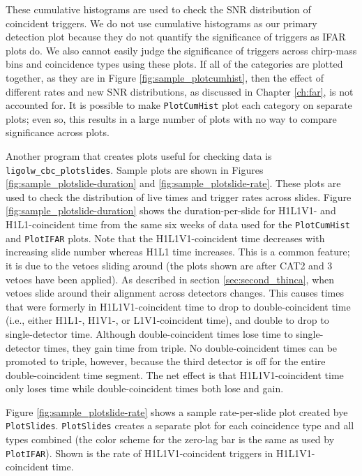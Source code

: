These cumulative histograms are used to check the \ac{SNR} distribution of
coincident triggers. We do not use cumulative histograms as our primary
detection plot because they do not quantify the significance of triggers as
IFAR plots do. We also cannot easily judge the significance of triggers across
chirp-mass bins and coincidence types using these plots. If all of the
categories are plotted together, as they are in Figure
\ref{fig:sample_plotcumhist}, then the effect of different rates and new
\ac{SNR} distributions, as discussed in Chapter \ref{ch:far}, is not accounted
for. It is possible to make \texttt{PlotCumHist} plot each category on separate
plots; even so, this results in a large number of plots with no way to compare
significance across plots.

Another program that creates plots useful for checking data is \\
\verb|ligolw_cbc_plotslides|. Sample plots are shown in Figures
\ref{fig:sample_plotslide-duration} and \ref{fig:sample_plotslide-rate}. These
plots are used to check the distribution of live times and trigger rates across
slides. Figure \ref{fig:sample_plotslide-duration} shows the duration-per-slide
for H1L1V1- and H1L1-coincident time from the same six weeks of data used for
the \texttt{PlotCumHist} and \texttt{PlotIFAR} plots. Note that the
H1L1V1-coincident time decreases with increasing slide number whereas H1L1 time
increases. This is a common feature; it is due to the vetoes sliding around
(the plots shown are after CAT2 and 3 vetoes have been applied). As described
in section \ref{sec:second_thinca}, when vetoes slide around their alignment
across detectors changes. This causes times that were formerly in
H1L1V1-coincident time to drop to double-coincident time (i.e., either H1L1-,
H1V1-, or L1V1-coincident time), and double to drop to single-detector time.
Although double-coincident times lose time to single-detector times, they gain
time from triple. No double-coincident times can be promoted to triple,
however, because the third detector is off for the entire double-coincident
time segment. The net effect is that H1L1V1-coincident time only loses time
while double-coincident times both lose and gain.

Figure \ref{fig:sample_plotslide-rate} shows a sample rate-per-slide plot
created bye \texttt{PlotSlides}. \texttt{PlotSlides} creates a separate plot
for each coincidence type and all types combined (the color scheme for the
zero-lag bar is the same as used by \texttt{PlotIFAR}). Shown is the rate of
H1L1V1-coincident triggers in H1L1V1-coincident time.

